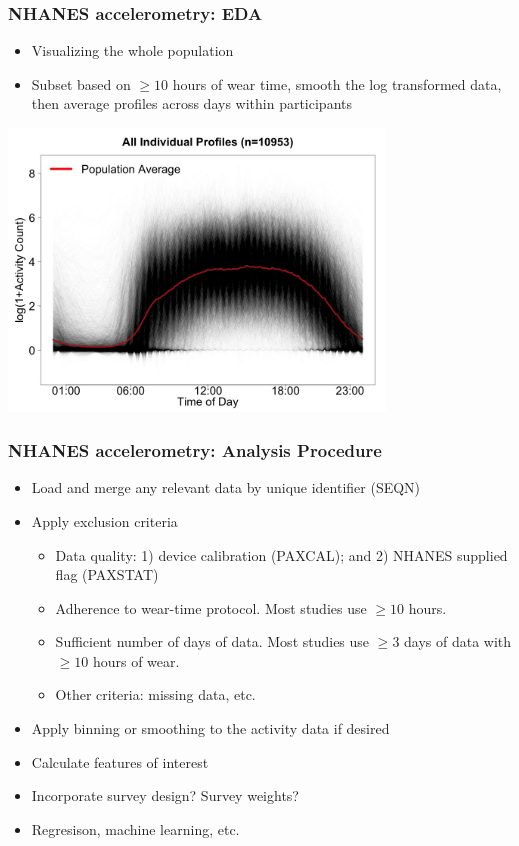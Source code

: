 \documentclass[10pt]{beamer}\usepackage[]{graphicx}\usepackage[]{color}
\begin{document}
\begin{frame}
\frametitle{NHANES accelerometry: EDA}
\begin{itemize} 
\item Visualizing the whole population
\item Subset based on $\geq 10$ hours of wear time, smooth the log transformed data, then average profiles across days within participants
\end{itemize}
\begin{center}
\includegraphics[width=0.75\textwidth]{population_curves}
\end{center}
\end{frame}



\begin{frame}
\frametitle{NHANES accelerometry: Analysis Procedure}
\begin{itemize}
\item Load and merge any relevant data by unique identifier (SEQN)
\item Apply exclusion criteria
    \begin{itemize}
    \item Data quality: 1) device calibration (PAXCAL); and 2) NHANES supplied flag (PAXSTAT)
    \item Adherence to wear-time protocol. Most studies use $\geq 10$ hours.
    \item Sufficient number of days of data. Most studies use $ \geq 3$ days of data with $\geq 10$ hours of wear.
    \item Other criteria: missing data, etc.
    \end{itemize}   
\item Apply binning or smoothing to the activity data if desired
\item Calculate features of interest
\item Incorporate survey design? Survey weights?
\item Regresison, machine learning, etc.
\end{itemize}
\end{frame}
\end{document}
